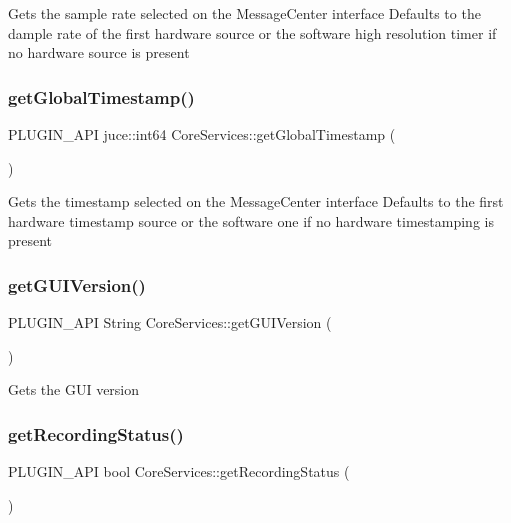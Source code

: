 Gets the sample rate selected on the Message\+Center interface Defaults to the dample rate of the first hardware source or the software high resolution timer if no hardware source is present \mbox{\label{namespace_core_services_a79defb96087c3bddcb388a29a38d6952}} 
\subsubsection{\texorpdfstring{get\+Global\+Timestamp()}{getGlobalTimestamp()}}
{\footnotesize\ttfamily P\+L\+U\+G\+I\+N\+\_\+\+A\+PI juce\+::int64 Core\+Services\+::get\+Global\+Timestamp (\begin{DoxyParamCaption}{ }\end{DoxyParamCaption})}

Gets the timestamp selected on the Message\+Center interface Defaults to the first hardware timestamp source or the software one if no hardware timestamping is present \mbox{\label{namespace_core_services_a93a10ea82325f2a1baf74ee22e5dbd23}} 
\subsubsection{\texorpdfstring{get\+G\+U\+I\+Version()}{getGUIVersion()}}
{\footnotesize\ttfamily P\+L\+U\+G\+I\+N\+\_\+\+A\+PI String Core\+Services\+::get\+G\+U\+I\+Version (\begin{DoxyParamCaption}{ }\end{DoxyParamCaption})}

Gets the G\+UI version \mbox{\label{namespace_core_services_a877cdc8ef0b6ea0dce61575de663c6f3}} 
\subsubsection{\texorpdfstring{get\+Recording\+Status()}{getRecordingStatus()}}
{\footnotesize\ttfamily P\+L\+U\+G\+I\+N\+\_\+\+A\+PI bool Core\+Services\+::get\+Recording\+Status (\begin{DoxyParamCaption}{ }\end{DoxyParamCaption})}

